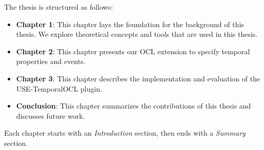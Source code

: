 The thesis is structured as follows:
\begin{itemize}
  \item \textbf{Chapter 1}: This chapter lays the foundation for the background of this thesis.
  We explore theoretical concepts and tools that are used in this thesis.
  
  \item \textbf{Chapter 2}: This chapter presents our OCL extension to specify temporal properties and events.

  \item \textbf{Chapter 3}: This chapter describes the implementation and evaluation of the USE-TemporalOCL plugin. 

  \item \textbf{Conclusion}: This chapter summarizes the contributions of this thesis and discusses future work.
\end{itemize}

Each chapter starts with an \textit{Introduction} section, then ends with a \textit{Summary} section.






